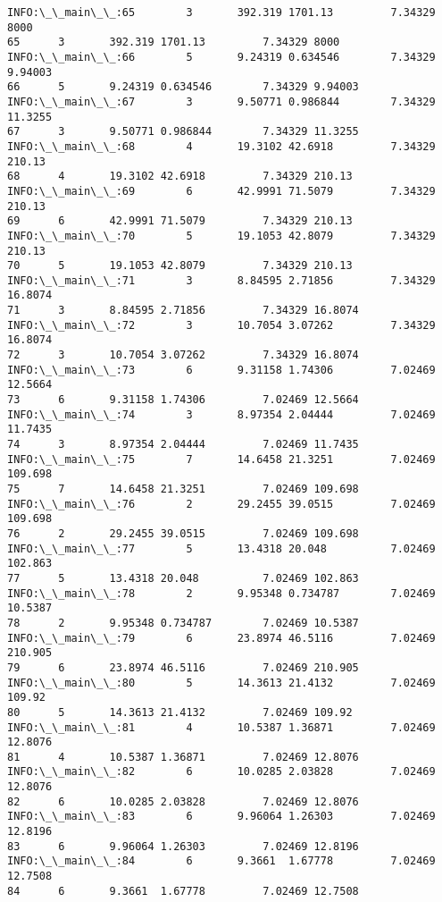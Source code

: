 \documentclass[11pt]{article}
\begin{document}
\begin{Verbatim}[commandchars=\\\{\}]
INFO:\_\_main\_\_:65        3       392.319 1701.13         7.34329 8000
65      3       392.319 1701.13         7.34329 8000
INFO:\_\_main\_\_:66        5       9.24319 0.634546        7.34329 9.94003
66      5       9.24319 0.634546        7.34329 9.94003
INFO:\_\_main\_\_:67        3       9.50771 0.986844        7.34329 11.3255
67      3       9.50771 0.986844        7.34329 11.3255
INFO:\_\_main\_\_:68        4       19.3102 42.6918         7.34329 210.13
68      4       19.3102 42.6918         7.34329 210.13
INFO:\_\_main\_\_:69        6       42.9991 71.5079         7.34329 210.13
69      6       42.9991 71.5079         7.34329 210.13
INFO:\_\_main\_\_:70        5       19.1053 42.8079         7.34329 210.13
70      5       19.1053 42.8079         7.34329 210.13
INFO:\_\_main\_\_:71        3       8.84595 2.71856         7.34329 16.8074
71      3       8.84595 2.71856         7.34329 16.8074
INFO:\_\_main\_\_:72        3       10.7054 3.07262         7.34329 16.8074
72      3       10.7054 3.07262         7.34329 16.8074
INFO:\_\_main\_\_:73        6       9.31158 1.74306         7.02469 12.5664
73      6       9.31158 1.74306         7.02469 12.5664
INFO:\_\_main\_\_:74        3       8.97354 2.04444         7.02469 11.7435
74      3       8.97354 2.04444         7.02469 11.7435
INFO:\_\_main\_\_:75        7       14.6458 21.3251         7.02469 109.698
75      7       14.6458 21.3251         7.02469 109.698
INFO:\_\_main\_\_:76        2       29.2455 39.0515         7.02469 109.698
76      2       29.2455 39.0515         7.02469 109.698
INFO:\_\_main\_\_:77        5       13.4318 20.048          7.02469 102.863
77      5       13.4318 20.048          7.02469 102.863
INFO:\_\_main\_\_:78        2       9.95348 0.734787        7.02469 10.5387
78      2       9.95348 0.734787        7.02469 10.5387
INFO:\_\_main\_\_:79        6       23.8974 46.5116         7.02469 210.905
79      6       23.8974 46.5116         7.02469 210.905
INFO:\_\_main\_\_:80        5       14.3613 21.4132         7.02469 109.92
80      5       14.3613 21.4132         7.02469 109.92
INFO:\_\_main\_\_:81        4       10.5387 1.36871         7.02469 12.8076
81      4       10.5387 1.36871         7.02469 12.8076
INFO:\_\_main\_\_:82        6       10.0285 2.03828         7.02469 12.8076
82      6       10.0285 2.03828         7.02469 12.8076
INFO:\_\_main\_\_:83        6       9.96064 1.26303         7.02469 12.8196
83      6       9.96064 1.26303         7.02469 12.8196
INFO:\_\_main\_\_:84        6       9.3661  1.67778         7.02469 12.7508
84      6       9.3661  1.67778         7.02469 12.7508

\end{Verbatim}
\end{document}
